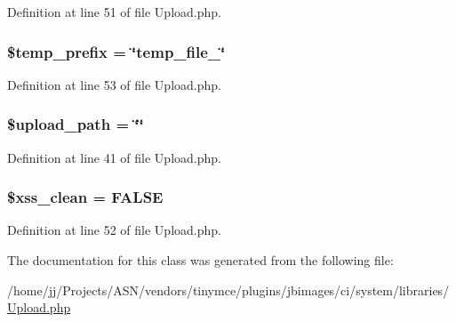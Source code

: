 Definition at line 51 of file Upload.\+php.

\subsubsection[{\texorpdfstring{\$temp\+\_\+prefix}{$temp_prefix}}]{\setlength{\rightskip}{0pt plus 5cm}\$temp\+\_\+prefix = \char`\"{}temp\+\_\+file\+\_\+\char`\"{}}\hypertarget{class_c_i___upload_ab38888cba65ae75bbc5b3841bc69d64a}{}\label{class_c_i___upload_ab38888cba65ae75bbc5b3841bc69d64a}


Definition at line 53 of file Upload.\+php.

\subsubsection[{\texorpdfstring{\$upload\+\_\+path}{$upload_path}}]{\setlength{\rightskip}{0pt plus 5cm}\$upload\+\_\+path = \char`\"{}\char`\"{}}\hypertarget{class_c_i___upload_a38507bf82f955d4b13642a3c7fd6e773}{}\label{class_c_i___upload_a38507bf82f955d4b13642a3c7fd6e773}


Definition at line 41 of file Upload.\+php.

\subsubsection[{\texorpdfstring{\$xss\+\_\+clean}{$xss_clean}}]{\setlength{\rightskip}{0pt plus 5cm}\$xss\+\_\+clean = F\+A\+L\+SE}\hypertarget{class_c_i___upload_a0f2ee8861c0b3164a5c6e126dd98c0cc}{}\label{class_c_i___upload_a0f2ee8861c0b3164a5c6e126dd98c0cc}


Definition at line 52 of file Upload.\+php.



The documentation for this class was generated from the following file\+:\begin{DoxyCompactItemize}
\item 
/home/jj/\+Projects/\+A\+S\+N/vendors/tinymce/plugins/jbimages/ci/system/libraries/\hyperlink{_upload_8php}{Upload.\+php}\end{DoxyCompactItemize}
